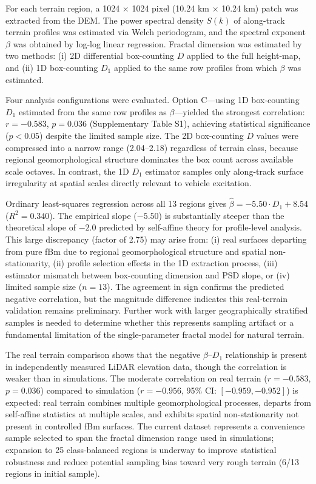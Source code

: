 \documentclass[11pt,letterpaper]{article}
\begin{document}
For each terrain region, a 1024 $\times$ 1024 pixel (10.24 km $\times$ 10.24 km) patch was extracted from the DEM. The power spectral density $S(k)$ of along-track terrain profiles was estimated via Welch periodogram, and the spectral exponent $\beta$ was obtained by log-log linear regression. Fractal dimension was estimated by two methods: (i) 2D differential box-counting $D$ applied to the full height-map, and (ii) 1D box-counting $D_1$ applied to the same row profiles from which $\beta$ was estimated.

Four analysis configurations were evaluated. Option C---using 1D box-counting $D_1$ estimated from the same row profiles as $\beta$---yielded the strongest correlation: $r = -0.583$, $p = 0.036$ (Supplementary Table S1), achieving statistical significance ($p < 0.05$) despite the limited sample size. The 2D box-counting $D$ values were compressed into a narrow range (2.04--2.18) regardless of terrain class, because regional geomorphological structure dominates the box count across available scale octaves. In contrast, the 1D $D_1$ estimator samples only along-track surface irregularity at spatial scales directly relevant to vehicle excitation.

Ordinary least-squares regression across all 13 regions gives $\hat{\beta} = -5.50 \cdot D_1 + 8.54$ ($R^2 = 0.340$). The empirical slope ($-5.50$) is substantially steeper than the theoretical slope of $-2.0$ predicted by self-affine theory for profile-level analysis. This large discrepancy (factor of 2.75) may arise from: (i) real surfaces departing from pure fBm due to regional geomorphological structure and spatial non-stationarity, (ii) profile selection effects in the 1D extraction process, (iii) estimator mismatch between box-counting dimension and PSD slope, or (iv) limited sample size ($n=13$). The agreement in sign confirms the predicted negative correlation, but the magnitude difference indicates this real-terrain validation remains preliminary. Further work with larger geographically stratified samples is needed to determine whether this represents sampling artifact or a fundamental limitation of the single-parameter fractal model for natural terrain.

The real terrain comparison shows that the negative $\beta$--$D_1$ relationship is present in independently measured LiDAR elevation data, though the correlation is weaker than in simulations. The moderate correlation on real terrain ($r = -0.583$, $p = 0.036$) compared to simulation ($r = -0.956$, 95\% CI: $[-0.959, -0.952]$) is expected: real terrain combines multiple geomorphological processes, departs from self-affine statistics at multiple scales, and exhibits spatial non-stationarity not present in controlled fBm surfaces. The current dataset represents a convenience sample selected to span the fractal dimension range used in simulations; expansion to 25 class-balanced regions is underway to improve statistical robustness and reduce potential sampling bias toward very rough terrain (6/13 regions in initial sample).
\end{document}
